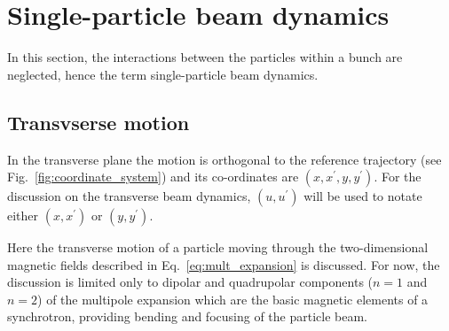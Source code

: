 \section{Single-particle beam dynamics}\label{sec:single_particle_dynamics}
In this section, the interactions between the particles within a bunch are neglected, hence the term single-particle beam dynamics. 






\subsection{Transvserse motion}
In the transverse plane the motion is orthogonal to the reference trajectory (see Fig.~\ref{fig:coordinate_system}) and its co-ordinates are $(x, x^\prime, y, y^\prime)$. For the discussion on the transverse beam dynamics, $(u, u^\prime)$ will be used to notate either $(x, x^\prime)$ or $(y, y^\prime)$.

Here the transverse motion of a particle moving through the two-dimensional magnetic fields described in Eq.~\eqref{eq:mult_expansion} is discussed. For now, the discussion is limited only to dipolar and quadrupolar components ($n=1$ and $n=2$) of the multipole expansion which are the basic magnetic elements of a synchrotron, providing bending and focusing of the particle beam. 

